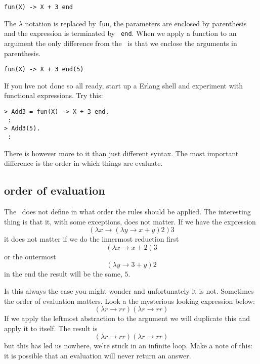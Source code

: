 \documentclass[a4paper,11pt]{article}
\begin{document}
\vspace{10pt}
\begin{center}{\tt fun(X) ->  X  + 3 end}
\end{center}
\vspace{10pt}

The $\lambda$ notation is replaced by {\tt fun}, the parameters are
enclosed by parenthesis and the expression is terminated by {\tt
  end}. When we apply a function to an argument the only difference
from the \lamc\ is that we enclose the arguments in parenthesis.

\vspace{10pt}
\begin{center}{\tt fun(X) ->  X  + 3 end(5)}
\end{center}
\vspace{10pt}

If you hve not done so all ready, start up a Erlang shell and
experiment with functional expressions. Try this:

\begin{verbatim}
> Add3 = fun(X) -> X + 3 end.
 :
> Add3(5).
 :
\end{verbatim}

There is however more to it than just different syntax. The most
important difference is the order in which things are evaluate.


\subsection{order of evaluation}

The \lamc\ does not define in what order the rules should be applied. The
interesting thing is that it, with some exceptions, does not matter. If we
have the expression
$$(\lambda x \rightarrow (\lambda y \rightarrow x + y) 2) 3$$ 
it does not matter if we do the innermost reduction first
$$(\lambda x \rightarrow x + 2) 3$$ 
or the outermost 
$$ (\lambda y \rightarrow 3 + y) 2$$ 
in the end the result will be the same, $5$.

Is this always the case you might wonder and unfortunately it is not.
Sometimes the order of evaluation matters. Look a the mysterious
looking expression below:
$$(\lambda r \rightarrow r r)(\lambda r \rightarrow r r)$$ 
If we apply the leftmost abstraction to the argument we will duplicate
this and apply it to itself. The result is
$$(\lambda r \rightarrow r r)(\lambda r \rightarrow r r)$$ 
but this has led us nowhere, we're stuck in an infinite loop. Make a
note of this: it is possible that an evaluation will never return an answer.
\end{document}
